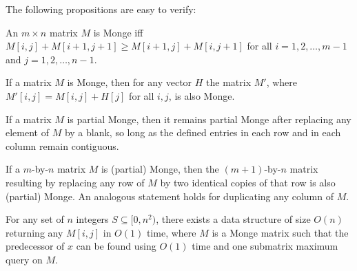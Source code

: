 \documentclass{llncs}
\begin{document}
\noindent The following propositions are easy to verify:

\begin{proposition}
\label{prop:adjacent condition}
An $m\times n$ matrix $M$ is Monge iff $M[i,j]+M[i+1,j+1] \ge M[i+1,j]+M[i,j+1]$ for all $i=1,2,\ldots,m-1$ and $j=1,2,\ldots,n-1$.
\end{proposition}

\begin{proposition}
\label{prop:adjustment}
If a matrix $M$ is Monge, then for any vector $H$ the matrix $M'$, where $M'[i,j]=M[i,j]+H[j]$ for all $i,j$, is also Monge.
\end{proposition}

\begin{proposition}
\label{prop:undef}
If a matrix $M$ is partial Monge, then it remains partial Monge after replacing any element of $M$ by a blank, so long as the defined entries in each row and in each column remain contiguous.
\end{proposition}

\begin{proposition}
\label{prop:duplicate}
If a $m$-by-$n$ matrix $M$ is (partial) Monge, then the $(m+1)$-by-$n$ matrix resulting by replacing any row of $M$ by two identical copies of that row is also (partial) Monge. An analogous statement holds for duplicating any column of $M$. 
\end{proposition}

\begin{theorem}
\label{thm:reduction}
For any set of $n$ integers $S\subseteq [0,n^{2})$, there exists a data structure of size $O(n)$ returning any $M[i,j]$
in $O(1)$ time, where $M$ is a Monge matrix such that the predecessor of $x$ can be found using $O(1)$ time and one
submatrix maximum query on $M$.

\end{theorem}
\end{document}

